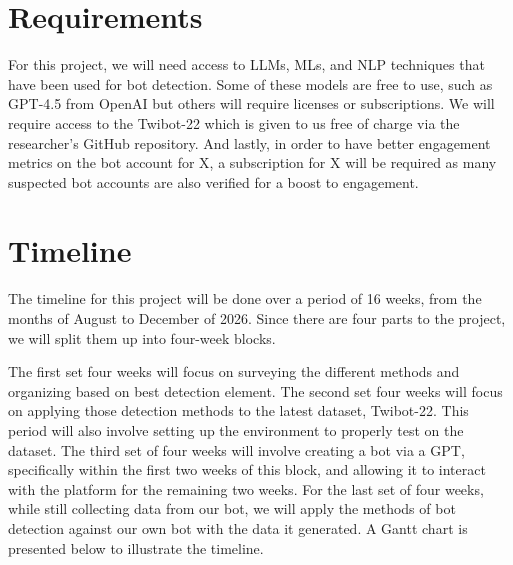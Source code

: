 \section{Requirements}
For this project, we will need access to LLMs, MLs, and NLP techniques that have been used for bot detection. Some of these models are free to use, such as GPT-4.5 from OpenAI but others will require licenses or subscriptions. We will require access to the Twibot-22 which is given to us free of charge via the researcher's GitHub repository. And lastly, in order to have better engagement metrics on the bot account for X, a subscription for X will be required as many suspected bot accounts are also verified for a boost to engagement.
\section{Timeline}
The timeline for this project will be done over a period of 16 weeks, from the months of August to December of 2026. Since there are four parts to the project, we will split them up into four-week blocks. 

The first set four weeks will focus on surveying the different methods and organizing based on best detection element. The second set four weeks will focus on applying those detection methods to the latest dataset, Twibot-22. This period will also involve setting up the environment to properly test on the dataset. The third set of four weeks will involve creating a bot via a GPT, specifically within the first two weeks of this block, and allowing it to interact with the platform for the remaining two weeks. For the last set of four weeks, while still collecting data from our bot, we will apply the methods of bot detection against our own bot with the data it generated. A Gantt chart is presented below to illustrate the timeline.


